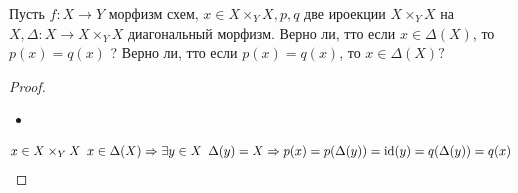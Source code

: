 \begin{prob}
Пусть $f: X \rightarrow Y$ морфизм схем, $x \in X \times_Y X, p, q$ две ироекции $X \times_Y X$ на $X, \Delta: X \rightarrow X \times_Y X$ диагональный морфизм. Верно ли, тто если $x \in \Delta(X)$, то $p(x)=q(x)$ ? Верно ли, тто если $p(x)=q(x)$, то $x \in \Delta(X) ?$
\end{prob}
\begin{proof}
\begin{itemize}
\item[]
\end{itemize}

\begin{gather*}
    x \in X \times_Y X\hspace{0.5em} x \in \Delta(X)
    \Rightarrow \exists y \in X\hspace{0.5em} \Delta(y) = X
    \Rightarrow p(x) = p(\Delta(y)) = \operatorname{id}(y)
    = q(\Delta(y)) = q(x)
\end{gather*}


\end{proof}

